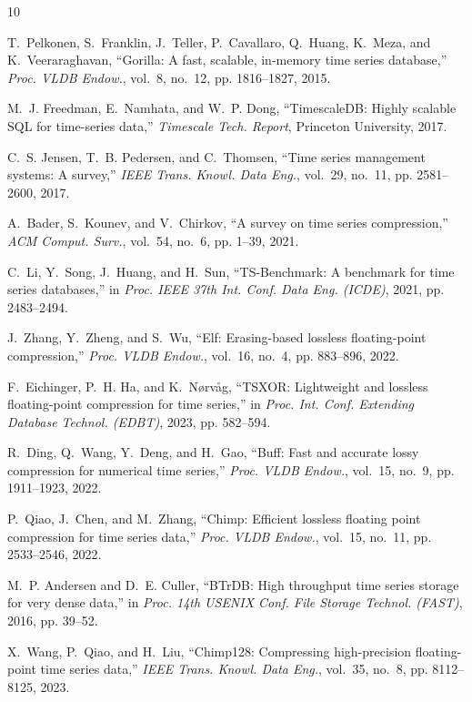 \documentclass[conference,a4paper]{IEEEtran}
\begin{document}
\balance

\begin{thebibliography}{10}

T.~Pelkonen, S.~Franklin, J.~Teller, P.~Cavallaro, Q.~Huang, K.~Meza, and K.~Veeraraghavan, ``Gorilla: A fast, scalable, in-memory time series database,'' \emph{Proc. VLDB Endow.}, vol.~8, no.~12, pp. 1816--1827, 2015.

M.~J. Freedman, E.~Namhata, and W.~P. Dong, ``TimescaleDB: Highly scalable SQL for time-series data,'' \emph{Timescale Tech. Report}, Princeton University, 2017.

C.~S. Jensen, T.~B. Pedersen, and C.~Thomsen, ``Time series management systems: A survey,'' \emph{IEEE Trans. Knowl. Data Eng.}, vol.~29, no.~11, pp. 2581--2600, 2017.

A.~Bader, S.~Kounev, and V.~Chirkov, ``A survey on time series compression,'' \emph{ACM Comput. Surv.}, vol.~54, no.~6, pp. 1--39, 2021.

C.~Li, Y.~Song, J.~Huang, and H.~Sun, ``TS-Benchmark: A benchmark for time series databases,'' in \emph{Proc. IEEE 37th Int. Conf. Data Eng. (ICDE)}, 2021, pp. 2483--2494.

J.~Zhang, Y.~Zheng, and S.~Wu, ``Elf: Erasing-based lossless floating-point compression,'' \emph{Proc. VLDB Endow.}, vol.~16, no.~4, pp. 883--896, 2022.

F.~Eichinger, P.~H. Ha, and K.~N{\o}rv{\aa}g, ``TSXOR: Lightweight and lossless floating-point compression for time series,'' in \emph{Proc. Int. Conf. Extending Database Technol. (EDBT)}, 2023, pp. 582--594.

R.~Ding, Q.~Wang, Y.~Deng, and H.~Gao, ``Buff: Fast and accurate lossy compression for numerical time series,'' \emph{Proc. VLDB Endow.}, vol.~15, no.~9, pp. 1911--1923, 2022.

P.~Qiao, J.~Chen, and M.~Zhang, ``Chimp: Efficient lossless floating point compression for time series data,'' \emph{Proc. VLDB Endow.}, vol.~15, no.~11, pp. 2533--2546, 2022.

M.~P. Andersen and D.~E. Culler, ``BTrDB: High throughput time series storage for very dense data,'' in \emph{Proc. 14th USENIX Conf. File Storage Technol. (FAST)}, 2016, pp. 39--52.

X.~Wang, P.~Qiao, and H.~Liu, ``Chimp128: Compressing high-precision floating-point time series data,'' \emph{IEEE Trans. Knowl. Data Eng.}, vol.~35, no.~8, pp. 8112--8125, 2023.


\end{thebibliography}
\end{document}
